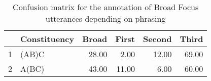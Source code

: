 \begin{table}[ht]
\centering
\begingroup\footnotesize
\begin{tabular}{rlrrrr}
  \hline
 & Constituency & Broad & First & Second & Third \\ 
  \hline
1 & (AB)C & 28.00 & 2.00 & 12.00 & 69.00 \\ 
  2 & A(BC) & 43.00 & 11.00 & 6.00 & 60.00 \\ 
   \hline
\end{tabular}
\endgroup
\caption{Confusion matrix for the annotation of Broad Focus utterances depending on phrasing} 
\label{confusionTable}
\end{table}
